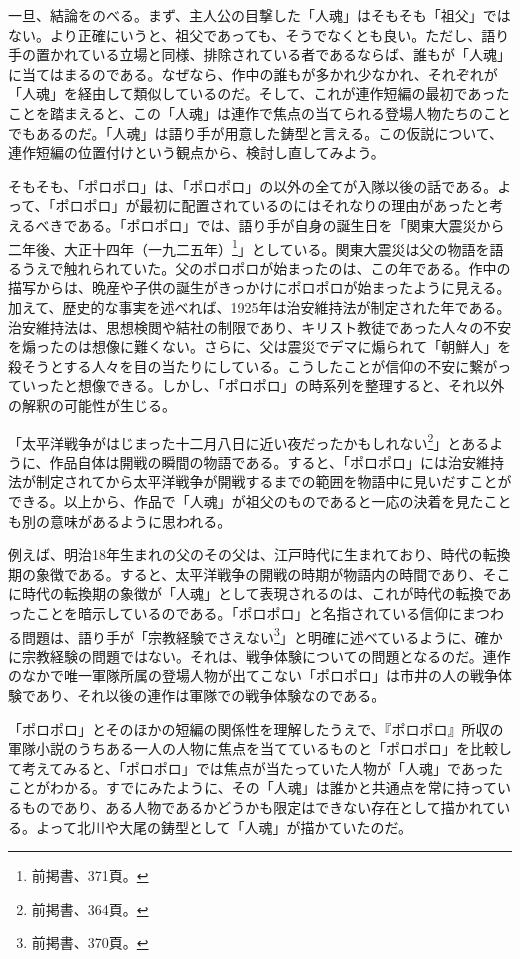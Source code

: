 一旦、結論をのべる。まず、主人公の目撃した「人魂」はそもそも「祖父」ではない。より正確にいうと、祖父であっても、そうでなくとも良い。ただし、語り手の置かれている立場と同様、排除されている者であるならば、誰もが「人魂」に当てはまるのである。なぜなら、作中の誰もが多かれ少なかれ、それぞれが「人魂」を経由して類似しているのだ。そして、これが連作短編の最初であったことを踏まえると、この「人魂」は連作で焦点の当てられる登場人物たちのことでもあるのだ。「人魂」は語り手が用意した鋳型と言える。この仮説について、連作短編の位置付けという観点から、検討し直してみよう。

そもそも、「ポロポロ」は、「ポロポロ」の以外の全てが入隊以後の話である。よって、「ポロポロ」が最初に配置されているのにはそれなりの理由があったと考えるべきである。「ポロポロ」では、語り手が自身の誕生日を「関東大震災から二年後、大正十四年（一九二五年）\footnote{前掲書、371頁。}」としている。関東大震災は父の物語を語るうえで触れられていた。父のポロポロが始まったのは、この年である。作中の描写からは、晩産や子供の誕生がきっかけにポロポロが始まったように見える。加えて、歴史的な事実を述べれば、1925年は治安維持法が制定された年である。治安維持法は、思想検閲や結社の制限であり、キリスト教徒であった人々の不安を煽ったのは想像に難くない。さらに、父は震災でデマに煽られて「朝鮮人」を殺そうとする人々を目の当たりにしている。こうしたことが信仰の不安に繋がっていったと想像できる。しかし、「ポロポロ」の時系列を整理すると、それ以外の解釈の可能性が生じる。

「太平洋戦争がはじまった十二月八日に近い夜だったかもしれない\footnote{前掲書、364頁。}」とあるように、作品自体は開戦の瞬間の物語である。すると、「ポロポロ」には治安維持法が制定されてから太平洋戦争が開戦するまでの範囲を物語中に見いだすことができる。以上から、作品で「人魂」が祖父のものであると一応の決着を見たことも別の意味があるように思われる。

例えば、明治18年生まれの父のその父は、江戸時代に生まれており、時代の転換期の象徴である。すると、太平洋戦争の開戦の時期が物語内の時間であり、そこに時代の転換期の象徴が「人魂」として表現されるのは、これが時代の転換であったことを暗示しているのである。「ポロポロ」と名指されている信仰にまつわる問題は、語り手が「宗教経験でさえない\footnote{前掲書、370頁。}」と明確に述べているように、確かに宗教経験の問題ではない。それは、戦争体験についての問題となるのだ。連作のなかで唯一軍隊所属の登場人物が出てこない「ポロポロ」は市井の人の戦争体験であり、それ以後の連作は軍隊での戦争体験なのである。

「ポロポロ」とそのほかの短編の関係性を理解したうえで、『ポロポロ』所収の軍隊小説のうちある一人の人物に焦点を当てているものと「ポロポロ」を比較して考えてみると、「ポロポロ」では焦点が当たっていた人物が「人魂」であったことがわかる。すでにみたように、その「人魂」は誰かと共通点を常に持っているものであり、ある人物であるかどうかも限定はできない存在として描かれている。よって北川や大尾の鋳型として「人魂」が描かていたのだ。

